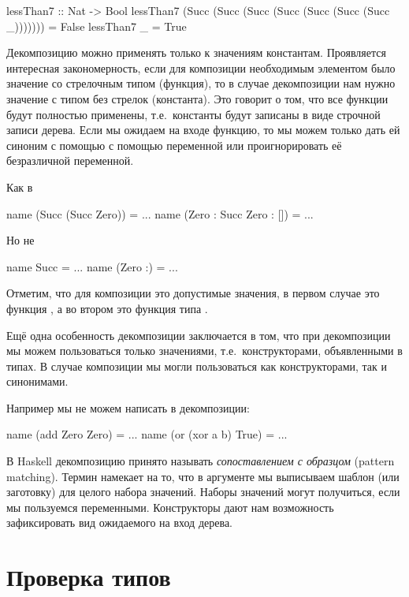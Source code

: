 \begin{code}
lessThan7 :: Nat -> Bool
lessThan7  (Succ (Succ (Succ (Succ (Succ (Succ (Succ _)))))))  = False
lessThan7  _                                                   = True
\end{code}

Декомпозицию можно применять
только к значениям константам. Проявляется интересная закономерность,
если для композиции необходимым элементом было значение со
стрелочным типом (функция), то в случае декомпозиции нам
нужно значение с типом без стрелок (константа). 
Это говорит о том, что все функции будут полностью применены,
т.е.~константы будут записаны в виде строчной записи дерева.
Если мы ожидаем на входе функцию, то мы можем только дать ей
синоним с помощью с помощью переменной или проигнорировать её безразличной
переменной.

Как в

\begin{code}
name  (Succ (Succ Zero))       = ...
name  (Zero : Succ Zero : [])  = ...
\end{code}

Но не

\begin{code}
name  Succ      = ...
name  (Zero :)  = ...
\end{code}

Отметим, что для композиции это допустимые значения, в первом случае
это функция , а во втором это функция типа
\mbox{\In{[Nat] -> [Nat]}}.


Ещё одна особенность декомпозиции заключается в том,
что при декомпозиции мы можем пользоваться только 
значениями, т.е.~конструкторами, объявленными в типах. 
В случае композиции мы могли 
пользоваться как конструкторами, так и синонимами.

Например мы не можем написать в декомпозиции:

\begin{code}
name  (add Zero Zero)      = ...
name  (or (xor a b) True)  = ...
\end{code}

В Haskell декомпозицию принято называть \emph{сопоставлением
с образцом} (pattern matching). Термин намекает на то, что
в аргументе мы выписываем шаблон (или заготовку) для целого
набора значений. Наборы значений могут получиться, если мы пользуемся
переменными. Конструкторы дают нам возможность зафиксировать
вид ожидаемого на вход дерева.

\section{Проверка типов}

